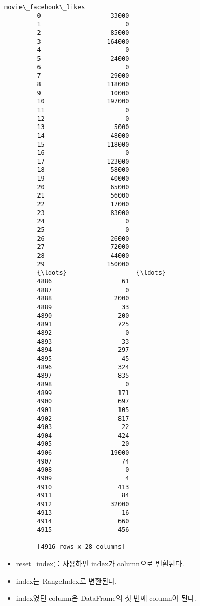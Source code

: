 \documentclass[11pt]{article}
\providecommand{\tightlist}{%
      \setlength{\itemsep}{0pt}\setlength{\parskip}{0pt}}
\begin{document}
\begin{Verbatim}[commandchars=\\\{\}]
              movie\_facebook\_likes  
         0                   33000  
         1                       0  
         2                   85000  
         3                  164000  
         4                       0  
         5                   24000  
         6                       0  
         7                   29000  
         8                  118000  
         9                   10000  
         10                 197000  
         11                      0  
         12                      0  
         13                   5000  
         14                  48000  
         15                 118000  
         16                      0  
         17                 123000  
         18                  58000  
         19                  40000  
         20                  65000  
         21                  56000  
         22                  17000  
         23                  83000  
         24                      0  
         25                      0  
         26                  26000  
         27                  72000  
         28                  44000  
         29                 150000  
         {\ldots}                   {\ldots}  
         4886                   61  
         4887                    0  
         4888                 2000  
         4889                   33  
         4890                  200  
         4891                  725  
         4892                    0  
         4893                   33  
         4894                  297  
         4895                   45  
         4896                  324  
         4897                  835  
         4898                    0  
         4899                  171  
         4900                  697  
         4901                  105  
         4902                  817  
         4903                   22  
         4904                  424  
         4905                   20  
         4906                19000  
         4907                   74  
         4908                    0  
         4909                    4  
         4910                  413  
         4911                   84  
         4912                32000  
         4913                   16  
         4914                  660  
         4915                  456  
         
         [4916 rows x 28 columns]
\end{Verbatim}
            
    \begin{itemize}
\tightlist
\item
  reset\_index를 사용하면 index가 column으로 변환된다.
\item
  index는 RangeIndex로 변환된다.
\item
  index였던 column은 DataFrame의 첫 번째 column이 된다.
\end{itemize}
\end{document}
